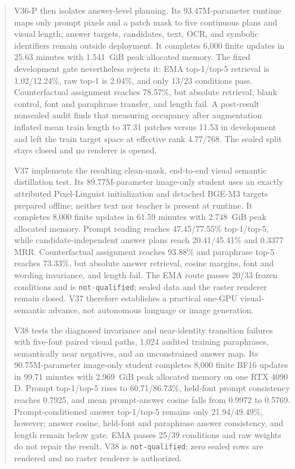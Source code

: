 \documentclass[11pt]{article}
\begin{document}
\begin{abstract}
V36-P then isolates answer-level planning. Its 93.47M-parameter runtime maps
only prompt pixels and a patch mask to five continuous plans and visual length;
answer targets, candidates, text, OCR, and symbolic identifiers remain outside
deployment. It completes 6,000 finite updates in 25.63 minutes with 1.541~GiB
peak allocated memory. The fixed development gate nevertheless rejects it:
EMA top-1/top-5 retrieval is 1.02/12.24\%, raw top-1 is 2.04\%, and only 13/23
conditions pass. Counterfactual assignment reaches 78.57\%, but absolute
retrieval, blank control, font and paraphrase transfer, and length fail. A
post-result nonsealed audit finds that measuring occupancy after augmentation
inflated mean train length to 37.31 patches versus 11.53 in development and
left the train target space at effective rank 4.77/768. The sealed split stays
closed and no renderer is opened.

V37 implements the resulting clean-mask, end-to-end visual semantic
distillation test. Its 89.77M-parameter image-only student uses an exactly
attributed Pixel-Linguist initialization and detached BGE-M3 targets prepared
offline; neither text nor teacher is present at runtime. It completes 8,000
finite updates in 61.59 minutes with 2.748~GiB peak allocated memory. Prompt
reading reaches 47.45/77.55\% top-1/top-5, while candidate-independent answer
plans reach 20.41/45.41\% and 0.3377 MRR. Counterfactual assignment reaches
93.88\% and paraphrase top-5 reaches 73.33\%, but absolute answer retrieval,
cosine margins, font and wording invariance, and length fail. The EMA route
passes 20/33 frozen conditions and is \texttt{not-qualified}; sealed data and
the raster renderer remain closed. V37 therefore establishes a practical
one-GPU visual-semantic advance, not autonomous language or image generation.

V38 tests the diagnosed invariance and near-identity transition failures with
five-font paired visual paths, 1,024 audited training paraphrases, semantically
near negatives, and an unconstrained answer map. Its 90.75M-parameter
image-only student completes 8,000 finite BF16 updates in 99.71 minutes with
2.969~GiB peak allocated memory on one RTX 4090 D. Prompt top-1/top-5 rises to
60.71/86.73\%, held-font prompt consistency reaches 0.7925, and mean
prompt-answer cosine falls from 0.9972 to 0.5769. Prompt-conditioned answer
top-1/top-5 remains only 21.94/49.49\%, however; answer cosine, held-font and
paraphrase answer consistency, and length remain below gate. EMA passes 25/39
conditions and raw weights do not repair the result. V38 is
\texttt{not-qualified}; zero sealed rows are rendered and no raster renderer
is authorized.


\end{abstract}
\end{document}
